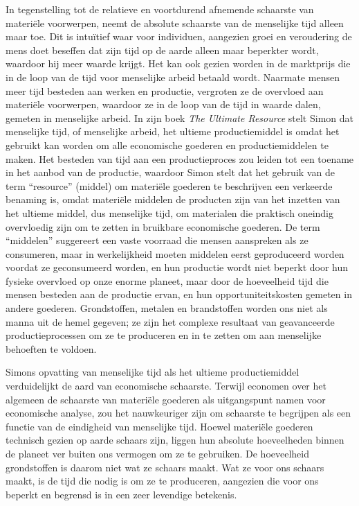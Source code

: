 In tegenstelling tot de relatieve en voortdurend afnemende schaarste van
materiële voorwerpen, neemt de absolute schaarste van de menselijke tijd
alleen maar toe. Dit is intuïtief waar voor individuen, aangezien groei
en veroudering de mens doet beseffen dat zijn tijd op de aarde alleen
maar beperkter wordt, waardoor hij meer waarde krijgt. Het kan ook
gezien worden in de marktprijs die in de loop van de tijd voor
menselijke arbeid betaald wordt. Naarmate mensen meer tijd besteden aan
werken en productie, vergroten ze de overvloed aan materiële voorwerpen,
waardoor ze in de loop van de tijd in waarde dalen, gemeten in
menselijke arbeid. In zijn boek \textit{The
Ultimate Resource} stelt Simon dat menselijke tijd, of menselijke
arbeid, het ultieme productiemiddel is omdat het gebruikt kan worden om
alle economische goederen en productiemiddelen te maken.\autocite{26}
Het besteden van tijd aan een productieproces zou leiden tot een toename
in het aanbod van de productie, waardoor Simon stelt dat het gebruik van
de term ``resource'' (middel) om materiële goederen te beschrijven een
verkeerde benaming is, omdat materiële middelen de producten zijn van
het inzetten van het ultieme middel, dus menselijke tijd, om materialen
die praktisch oneindig overvloedig zijn om te zetten in bruikbare
economische goederen. De term ``middelen'' suggereert een vaste voorraad
die mensen aanspreken als ze consumeren, maar in werkelijkheid moeten
middelen eerst geproduceerd worden voordat ze geconsumeerd worden, en
hun productie wordt niet beperkt door hun fysieke overvloed op onze
enorme planeet, maar door de hoeveelheid tijd die mensen besteden aan de
productie ervan, en hun opportuniteitskosten gemeten in andere goederen.
Grondstoffen, metalen en brandstoffen worden ons niet als manna uit de
hemel gegeven; ze zijn het complexe resultaat van geavanceerde
productieprocessen om ze te produceren en in te zetten om aan menselijke
behoeften te voldoen.

Simons opvatting van menselijke tijd als het ultieme productiemiddel
verduidelijkt de aard van economische schaarste. Terwijl economen over
het algemeen de schaarste van materiële goederen als uitgangspunt namen
voor economische analyse, zou het nauwkeuriger zijn om schaarste te
begrijpen als een functie van de eindigheid van menselijke tijd. Hoewel
materiële goederen technisch gezien op aarde schaars zijn, liggen hun
absolute hoeveelheden binnen de planeet ver buiten ons vermogen om ze te
gebruiken. De hoeveelheid grondstoffen is daarom niet wat ze schaars
maakt. Wat ze voor ons schaars maakt, is de tijd die nodig is om ze te
produceren, aangezien die voor ons beperkt en begrensd is in een zeer
levendige betekenis.


